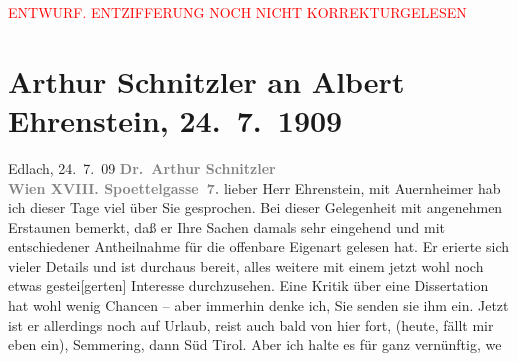
\begin{center}
            \textcolor{red}{ENTWURF. ENTZIFFERUNG NOCH NICHT KORREKTURGELESEN}
                      \end{center}
            
               \section[Arthur Schnitzler an Albert Ehrenstein, 24. 7. 1909]{ Arthur Schnitzler an Albert Ehrenstein, 24. 7. 1909}\nopagebreak{}\rehead{ }\begin{ledgroupsized}[t]{13cm}\normalsize\beginnumbering{} \toendnotes[C]{\smallbreak\pagebreak[2]} 
\toendnotes[C]{\smallbreak}\pstart
           \raggedleft{}{\pb}Edlach, 24. 7. 09\pend
           \pstart
           \textcolor{gray}{\textbf{Dr. Arthur Schnitzler}}{\\}\textcolor{gray}{\textbf{Wien XVIII. Spoettelgasse 7.}}\pend
           \pstart
           lieber Herr Ehrenstein, mit Auernheimer hab ich dieser Tage viel über Sie gesprochen. Bei dieser
                    Gelegenheit mit angenehmen Erstaunen bemerkt, daß er Ihre Sachen damals sehr
                    eingehend und mit entschiedener Antheilnahme für die offenbare Eigenart gelesen
                    hat. Er eri{\geminationn}erte sich vieler Details und ist
                    durchaus bereit, alles weitere mit einem jetzt wohl noch etwas gestei{\pb}{[}gerten{]} Interesse durchzusehen. Eine Kritik über eine Dissertation hat wohl wenig
                    Chancen – aber immerhin denke ich, Sie senden sie ihm ein. Jetzt ist er
                    allerdings noch auf Urlaub, reist auch bald von hier fort, (heute, fällt mir
                    eben ein), Semmering, dann Süd Tirol. Aber ich halte es für ganz vernünftig, we{\geminationn}

\end{ledgroupsized}
